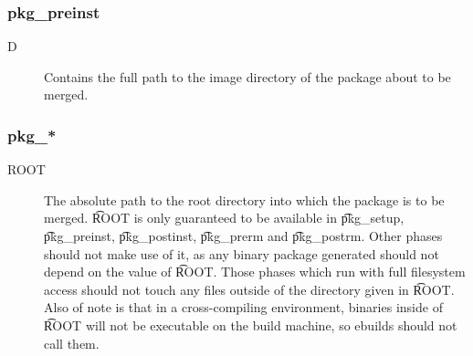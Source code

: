 \subsubsection{pkg\_preinst}
\begin{description}
\item[D] Contains the full path to the image directory of the package about to be merged.
\end{description}

\subsubsection{pkg\_*}
\begin{description}
\item[ROOT] The absolute path to the root directory into which the package is to be merged. \t{ROOT}
    is only guaranteed to be available in \t{pkg\_setup}, \t{pkg\_preinst}, \t{pkg\_postinst},
    \t{pkg\_prerm} and \t{pkg\_postrm}. Other phases should not make use of it, as any binary
    package generated should not depend on the value of \t{ROOT}. Those phases which run with full
    filesystem access should not touch any files outside of the directory given in \t{ROOT}. Also of
    note is that in a cross-compiling environment, binaries inside of \t{ROOT} will not be
    executable on the build machine, so ebuilds should not call them.
\end{description}

